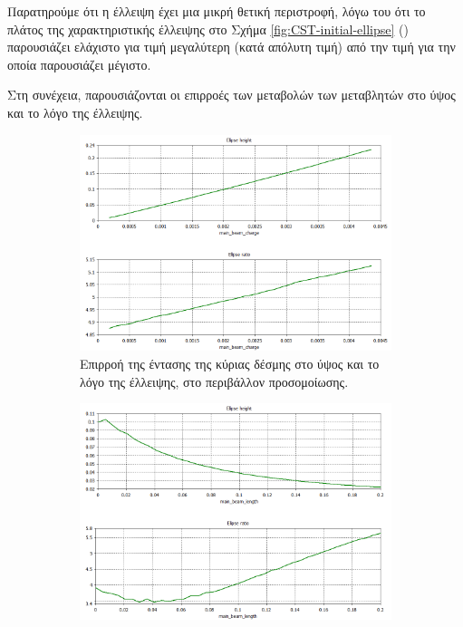 Παρατηρούμε ότι η έλλειψη έχει μια μικρή θετική περιστροφή, λόγω του ότι το πλάτος της χαρακτηριστικής έλλειψης στο Σχήμα \ref{fig:CST-initial-ellipse} () παρουσιάζει ελάχιστο για τιμή μεγαλύτερη (κατά απόλυτη τιμή) από την τιμή για την οποία παρουσιάζει μέγιστο.

Στη συνέχεια, παρουσιάζονται οι επιρροές των μεταβολών των μεταβλητών στο ύψος και το λόγο της έλλειψης.

\begin{figure}[tph]	
	\centering
	\begin{subfigure}{0.47\textwidth}
		\includegraphics[width=\linewidth]{figures/CST-variable-analysis/combined/CST-ellipse-height-ratio-by-bunch-intensity}
		\centering
		\caption{Επιρροή της έντασης της κύριας δέσμης στο ύψος και το λόγο της έλλειψης, στο περιβάλλον προσομοίωσης.}
		\label{fig:CST-ellipse-height-ratio-by-bunch-intensity}
	\end{subfigure}
	\hfill
	\begin{subfigure}{0.47\textwidth}
		\includegraphics[width=\linewidth]{figures/CST-variable-analysis/combined/CST-ellipse-height-ratio-by-bunch-length}

\end{subfigure}
\end{figure}
